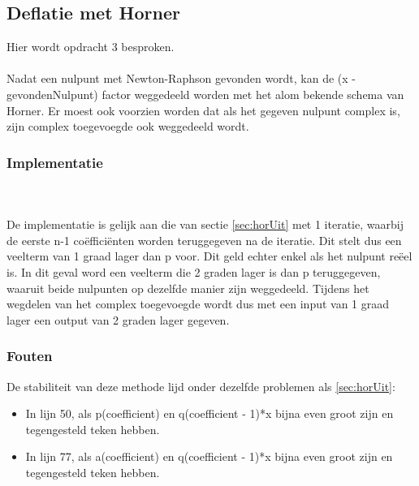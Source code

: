 \documentclass[a4paper,kulak]{kulakarticle}
\begin{document}
\subsection{Deflatie met Horner}
Hier wordt opdracht 3 besproken.\\~\\
Nadat een nulpunt met Newton-Raphson gevonden wordt, kan de (x - gevondenNulpunt) factor weggedeeld worden met het alom bekende schema van Horner. 
Er moest ook voorzien worden dat als het gegeven nulpunt complex is, zijn complex toegevoegde ook weggedeeld wordt.
\subsubsection{Implementatie}

~\\~\\
De implementatie is gelijk aan die van sectie \ref{sec:horUit} met 1 iteratie, waarbij de eerste n-1 coëfficiënten worden teruggegeven na de iteratie. Dit stelt dus een veelterm van 1 graad lager dan p voor. Dit geld echter enkel als het nulpunt reëel is. 
In dit geval word een veelterm die 2 graden lager is dan p teruggegeven, waaruit beide nulpunten op dezelfde manier zijn weggedeeld. Tijdens het wegdelen van het complex toegevoegde wordt dus met een input van 1 graad lager een output van 2 graden lager gegeven.

\subsubsection{Fouten}

De stabiliteit van deze methode lijd onder dezelfde problemen als \ref{sec:horUit}:
\begin{itemize}
	\item In lijn 50, als p(coefficient) en q(coefficient - 1)*x bijna even groot zijn en tegengesteld teken hebben.
	\item In lijn 77, als a(coefficient) en q(coefficient - 1)*x bijna even groot zijn en tegengesteld teken hebben.
\end{itemize}
\end{document}
